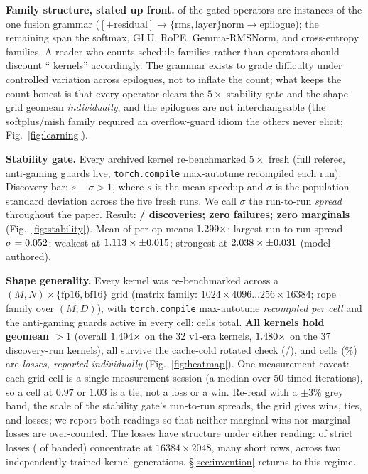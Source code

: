 \documentclass[10pt]{article}
\newcommand{\maxauto}{\texttt{torch.compile} max-autotune}
\begin{document}
\textbf{Family structure, stated up front.} \stabChainOps{} of the \stabOps{} gated
operators are instances of the one fusion grammar
($[\pm\text{residual}] \rightarrow \{\text{rms},\text{layer}\}\text{norm} \rightarrow
\text{epilogue}$); the remaining \stabDistinctOps{} span the softmax, GLU, RoPE,
Gemma-RMSNorm, and cross-entropy families. A reader who counts schedule families rather
than operators should discount ``\stabOps{} kernels'' accordingly. The grammar exists to
grade difficulty under controlled variation across epilogues, not to inflate the count;
what keeps the count honest is that every operator clears the $5\times$ stability gate and
the shape-grid geomean \emph{individually}, and the epilogues are not interchangeable (the
softplus/mish family required an overflow-guard idiom the others never elicit;
Fig.~\ref{fig:learning}).

\textbf{Stability gate.} Every archived kernel re-benchmarked $5\times$ fresh (full
referee, anti-gaming guards live, \maxauto{} recompiled each run). Discovery bar:
$\bar{s} - \sigma > 1$, where $\bar{s}$ is the mean speedup and $\sigma$ is the population
standard deviation across the five fresh runs. We call $\sigma$ the run-to-run
\emph{spread} throughout the paper. Result: \textbf{\stabDiscoveries/\stabOps{} discoveries; zero failures;
zero marginals} (Fig.~\ref{fig:stability}). Mean of per-op means
$1.299\times$; largest run-to-run spread $\sigma = 0.052$; weakest
\texttt{\stabWeakestOp} at $1.113\times\pm0.015$; strongest
\texttt{\stabStrongestOp} at $2.038\times\pm0.031$
(model-authored).

\textbf{Shape generality.} Every kernel was re-benchmarked across a
$(M,N)\times\{\text{fp16},\text{bf16}\}$ grid (matrix family:
$1024{\times}4096 \ldots 256{\times}16384$; rope family over $(M,D)$), with \maxauto{}
\emph{recompiled per cell} and the anti-gaming guards active in every cell:
\gridCellsTotal{} cells total. \textbf{All \stabOps{} kernels hold geomean $>1$}
(overall $1.494\times$ on the 32 v1-era kernels, $1.480\times$ on the
37 discovery-run kernels), all survive the cache-cold rotated check
(\gridRotOk/\gridRotN), and \gridLossesTotal{} cells (\gridLossPct\%) are \emph{losses,
reported individually} (Fig.~\ref{fig:heatmap}). One measurement caveat: each grid cell is
a single measurement session (a median over 50 timed iterations), so a cell at $0.97$ or
$1.03$ is a tie, not a loss or a win. Re-read with a $\pm 3\%$ grey band, the scale of the
stability gate's run-to-run spreads, the grid gives \gridBandWins{} wins, \gridBandTies{}
ties, and \gridBandLosses{} losses; we report both readings so that neither marginal wins
nor marginal losses are over-counted. The losses have structure under either reading:
\gridShortLossesTotal{} of \gridLossesTotal{} strict losses (\gridBandShortLosses{} of
\gridBandLosses{} banded) concentrate at $16384\times2048$, many
short rows, across two independently trained kernel generations. \S\ref{sec:invention}
returns to this regime.
\end{document}
